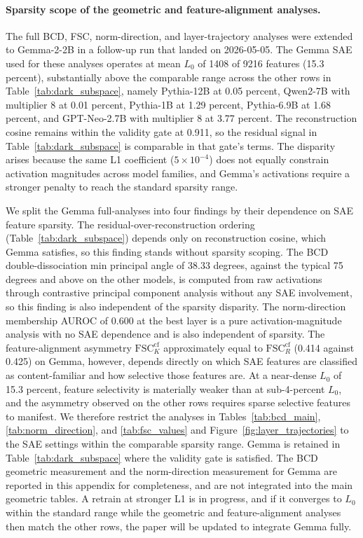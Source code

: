 \paragraph{Sparsity scope of the geometric and feature-alignment analyses.}
The full BCD, FSC, norm-direction, and layer-trajectory analyses were extended to Gemma-2-2B in a follow-up run that landed on 2026-05-05. The Gemma SAE used for these analyses operates at mean $L_0$ of 1408 of 9216 features (15.3 percent), substantially above the comparable range across the other rows in Table~\ref{tab:dark_subspace}, namely Pythia-12B at 0.05 percent, Qwen2-7B with multiplier 8 at 0.01 percent, Pythia-1B at 1.29 percent, Pythia-6.9B at 1.68 percent, and GPT-Neo-2.7B with multiplier 8 at 3.77 percent. The reconstruction cosine remains within the validity gate at 0.911, so the residual signal in Table~\ref{tab:dark_subspace} is comparable in that gate's terms. The disparity arises because the same L1 coefficient ($5 \times 10^{-4}$) does not equally constrain activation magnitudes across model families, and Gemma's activations require a stronger penalty to reach the standard sparsity range.

We split the Gemma full-analyses into four findings by their dependence on SAE feature sparsity. The residual-over-reconstruction ordering (Table~\ref{tab:dark_subspace}) depends only on reconstruction cosine, which Gemma satisfies, so this finding stands without sparsity scoping. The BCD double-dissociation min principal angle of 38.33 degrees, against the typical 75 degrees and above on the other models, is computed from raw activations through contrastive principal component analysis without any SAE involvement, so this finding is also independent of the sparsity disparity. The norm-direction membership AUROC of 0.600 at the best layer is a pure activation-magnitude analysis with no SAE dependence and is also independent of sparsity. The feature-alignment asymmetry $\mathrm{FSC}_K^{\mathrm{cf}}$ approximately equal to $\mathrm{FSC}_R^{\mathrm{cf}}$ (0.414 against 0.425) on Gemma, however, depends directly on which SAE features are classified as content-familiar and how selective those features are. At a near-dense $L_0$ of 15.3 percent, feature selectivity is materially weaker than at sub-4-percent $L_0$, and the asymmetry observed on the other rows requires sparse selective features to manifest. We therefore restrict the analyses in Tables~\ref{tab:bcd_main}, \ref{tab:norm_direction}, and \ref{tab:fsc_values} and Figure~\ref{fig:layer_trajectories} to the SAE settings within the comparable sparsity range. Gemma is retained in Table~\ref{tab:dark_subspace} where the validity gate is satisfied. The BCD geometric measurement and the norm-direction measurement for Gemma are reported in this appendix for completeness, and are not integrated into the main geometric tables. A retrain at stronger L1 is in progress, and if it converges to $L_0$ within the standard range while the geometric and feature-alignment analyses then match the other rows, the paper will be updated to integrate Gemma fully.


